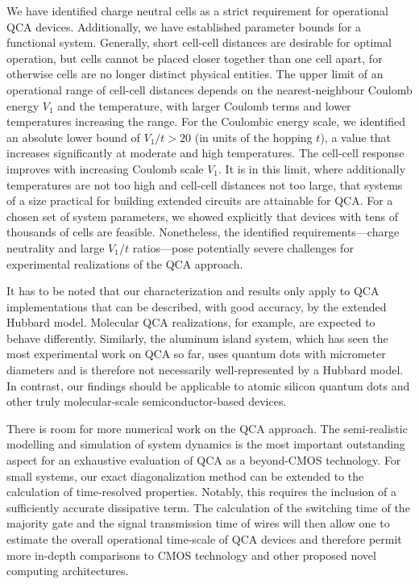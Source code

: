 We have identified charge neutral cells as a strict requirement for operational
QCA devices. Additionally, we have established parameter bounds for a functional
system. Generally, short cell-cell distances are desirable for optimal
operation, but cells cannot be placed closer together than one cell apart, for
otherwise cells are no longer distinct physical entities. The upper limit of an
operational range of cell-cell distances depends on the nearest-neighbour
Coulomb energy $V_1$ and the temperature, with larger Coulomb terms and lower
temperatures increasing the range. For the Coulombic energy scale, we identified
an absolute lower bound of $V_1/t > 20$ (in units of the hopping $t$), a value
that increases significantly at moderate and high temperatures. The cell-cell
response improves with increasing Coulomb scale $V_1$. It is in this limit,
where additionally temperatures are not too high and cell-cell distances not too
large, that systems of a size practical for building extended circuits are
attainable for QCA. For a chosen set of system parameters, we showed explicitly
that devices with tens of thousands of cells are feasible. Nonetheless, the
identified requirements---charge neutrality and large $V_1/t$ ratios---pose
potentially severe challenges for experimental realizations of the QCA approach.

It has to be noted that our characterization and results only apply to QCA
implementations that can be described, with good accuracy, by the extended
Hubbard model. Molecular QCA realizations, for example, are expected to behave
differently. Similarly, the aluminum island system, which has seen the most
experimental work on QCA so far, uses quantum dots with micrometer diameters and
is therefore not necessarily well-represented by a Hubbard model. In contrast,
our findings should be applicable to atomic silicon quantum dots and other truly
molecular-scale semiconductor-based devices.

There is room for more numerical work on the QCA approach. The semi-realistic
modelling and simulation of system dynamics is the most important outstanding
aspect for an exhaustive evaluation of QCA as a beyond-CMOS technology. For
small systems, our exact diagonalization method can be extended to the
calculation of time-resolved properties. Notably, this requires the inclusion of
a sufficiently accurate dissipative term. The calculation of the switching time
of the majority gate and the signal transmission time of wires will then allow
one to estimate the overall operational time-scale of QCA devices and therefore
permit more in-depth comparisons to CMOS technology and other proposed novel
computing architectures.


